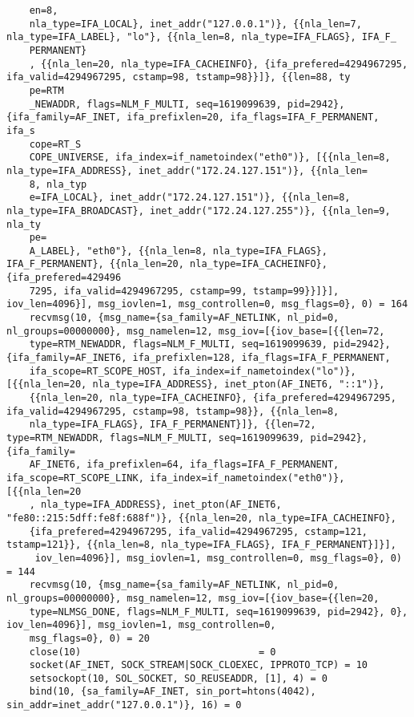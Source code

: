 \documentclass[pdf, unicode, 12pt, a4paper,oneside,fleqn]{article}
\begin{document}
{\begin{verbatim}
    en=8,
    nla_type=IFA_LOCAL}, inet_addr("127.0.0.1")}, {{nla_len=7, nla_type=IFA_LABEL}, "lo"}, {{nla_len=8, nla_type=IFA_FLAGS}, IFA_F_
    PERMANENT}
    , {{nla_len=20, nla_type=IFA_CACHEINFO}, {ifa_prefered=4294967295, ifa_valid=4294967295, cstamp=98, tstamp=98}}]}, {{len=88, ty
    pe=RTM
    _NEWADDR, flags=NLM_F_MULTI, seq=1619099639, pid=2942}, {ifa_family=AF_INET, ifa_prefixlen=20, ifa_flags=IFA_F_PERMANENT, ifa_s
    cope=RT_S
    COPE_UNIVERSE, ifa_index=if_nametoindex("eth0")}, [{{nla_len=8, nla_type=IFA_ADDRESS}, inet_addr("172.24.127.151")}, {{nla_len=
    8, nla_typ
    e=IFA_LOCAL}, inet_addr("172.24.127.151")}, {{nla_len=8, nla_type=IFA_BROADCAST}, inet_addr("172.24.127.255")}, {{nla_len=9, nla_ty
    pe=
    A_LABEL}, "eth0"}, {{nla_len=8, nla_type=IFA_FLAGS}, IFA_F_PERMANENT}, {{nla_len=20, nla_type=IFA_CACHEINFO}, {ifa_prefered=429496
    7295, ifa_valid=4294967295, cstamp=99, tstamp=99}}]}], iov_len=4096}], msg_iovlen=1, msg_controllen=0, msg_flags=0}, 0) = 164
    recvmsg(10, {msg_name={sa_family=AF_NETLINK, nl_pid=0, nl_groups=00000000}, msg_namelen=12, msg_iov=[{iov_base=[{{len=72,
    type=RTM_NEWADDR, flags=NLM_F_MULTI, seq=1619099639, pid=2942}, {ifa_family=AF_INET6, ifa_prefixlen=128, ifa_flags=IFA_F_PERMANENT,
    ifa_scope=RT_SCOPE_HOST, ifa_index=if_nametoindex("lo")}, [{{nla_len=20, nla_type=IFA_ADDRESS}, inet_pton(AF_INET6, "::1")},
    {{nla_len=20, nla_type=IFA_CACHEINFO}, {ifa_prefered=4294967295, ifa_valid=4294967295, cstamp=98, tstamp=98}}, {{nla_len=8,
    nla_type=IFA_FLAGS}, IFA_F_PERMANENT}]}, {{len=72, type=RTM_NEWADDR, flags=NLM_F_MULTI, seq=1619099639, pid=2942}, {ifa_family=
    AF_INET6, ifa_prefixlen=64, ifa_flags=IFA_F_PERMANENT, ifa_scope=RT_SCOPE_LINK, ifa_index=if_nametoindex("eth0")}, [{{nla_len=20
    , nla_type=IFA_ADDRESS}, inet_pton(AF_INET6, "fe80::215:5dff:fe8f:688f")}, {{nla_len=20, nla_type=IFA_CACHEINFO}, 
    {ifa_prefered=4294967295, ifa_valid=4294967295, cstamp=121, tstamp=121}}, {{nla_len=8, nla_type=IFA_FLAGS}, IFA_F_PERMANENT}]}],
     iov_len=4096}], msg_iovlen=1, msg_controllen=0, msg_flags=0}, 0) = 144
    recvmsg(10, {msg_name={sa_family=AF_NETLINK, nl_pid=0, nl_groups=00000000}, msg_namelen=12, msg_iov=[{iov_base={{len=20,
    type=NLMSG_DONE, flags=NLM_F_MULTI, seq=1619099639, pid=2942}, 0}, iov_len=4096}], msg_iovlen=1, msg_controllen=0,
    msg_flags=0}, 0) = 20
    close(10)                               = 0
    socket(AF_INET, SOCK_STREAM|SOCK_CLOEXEC, IPPROTO_TCP) = 10
    setsockopt(10, SOL_SOCKET, SO_REUSEADDR, [1], 4) = 0
    bind(10, {sa_family=AF_INET, sin_port=htons(4042), sin_addr=inet_addr("127.0.0.1")}, 16) = 0

\end{verbatim}}
\end{document}
